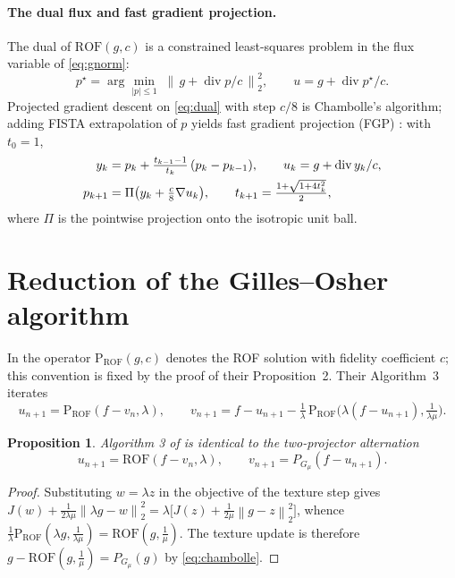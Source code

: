 \documentclass[11pt]{article}
\newtheorem{proposition}[theorem]{Proposition}
\theoremstyle{definition}
\newcommand{\norm}[1]{\left\lVert #1 \right\rVert}
\newcommand{\ROF}{\mathrm{ROF}}
\newcommand{\PG}{P_{G_\mu}}
\newcommand{\dv}{\operatorname{div}}
\begin{document}
\paragraph{The dual flux and fast gradient projection.}
The dual of $\ROF(g,c)$ is a constrained least-squares problem in the flux
variable of \eqref{eq:gnorm}:
\begin{equation}
p^\star=\arg\min_{|p|\le1}\;\norm{\,g+\dv p/c\,}_2^2,
\qquad u = g+\dv p^\star/c .
\label{eq:dual}
\end{equation}
Projected gradient descent on \eqref{eq:dual} with step $c/8$ is
Chambolle's algorithm; adding FISTA extrapolation of $p$ yields fast
gradient projection (FGP) \cite{beck}: with $t_0=1$,
\begin{align}
y_k &= p_k + \tfrac{t_{k-1}-1}{t_k}\,(p_k-p_{k-1}),\qquad
u_k = g+\dv y_k/c,\notag\\
p_{k+1} &= \Pi\bigl(y_k+\tfrac{c}{8}\nabla u_k\bigr),\qquad
t_{k+1}=\tfrac{1+\sqrt{1+4t_k^2}}{2},
\label{eq:fgp}
\end{align}
where $\Pi$ is the pointwise projection onto the isotropic unit ball.

\section{Reduction of the Gilles--Osher algorithm}

In \cite{gilles} the operator $\mathrm{P}_{\ROF}(g,c)$ denotes the ROF
solution with fidelity coefficient $c$; this convention is fixed by the
proof of their Proposition~2. Their Algorithm~3 iterates
\[
u_{n+1}=\mathrm{P}_{\ROF}(f-v_n,\lambda),\qquad
v_{n+1}=f-u_{n+1}-\tfrac{1}{\lambda}\,
\mathrm{P}_{\ROF}\!\bigl(\lambda(f-u_{n+1}),\tfrac{1}{\lambda\mu}\bigr).
\]

\begin{proposition}
\label{prop:reduction}
Algorithm 3 of \cite{gilles} is identical to the two-projector alternation
\begin{equation}
u_{n+1}=\ROF(f-v_n,\lambda),\qquad
v_{n+1}=\PG(f-u_{n+1}).
\label{eq:alternation}
\end{equation}
\end{proposition}

\begin{proof}
Substituting $w=\lambda z$ in the objective of the texture step gives
$J(w)+\tfrac{1}{2\lambda\mu}\norm{\lambda g-w}_2^2
=\lambda\bigl[J(z)+\tfrac{1}{2\mu}\norm{g-z}_2^2\bigr]$, whence
$\tfrac{1}{\lambda}\mathrm{P}_{\ROF}(\lambda g,\tfrac{1}{\lambda\mu})
=\ROF(g,\tfrac{1}{\mu})$. The texture update is therefore
$g-\ROF(g,\tfrac1\mu)=\PG(g)$ by \eqref{eq:chambolle}.
\end{proof}
\end{document}
